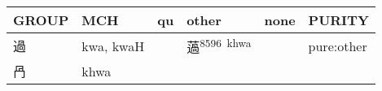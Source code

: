 \documentclass[14pt,a4paper]{scrartcl}
\begin{document}
\begin{longtable}[c]{@{}llllll@{}}
\toprule
\begin{minipage}[b]{0.14\columnwidth}\raggedright\strut
GROUP
\strut\end{minipage} &
\begin{minipage}[b]{0.14\columnwidth}\raggedright\strut
MCH
\strut\end{minipage} &
\begin{minipage}[b]{0.14\columnwidth}\raggedright\strut
qu
\strut\end{minipage} &
\begin{minipage}[b]{0.14\columnwidth}\raggedright\strut
other
\strut\end{minipage} &
\begin{minipage}[b]{0.14\columnwidth}\raggedright\strut
none
\strut\end{minipage} &
\begin{minipage}[b]{0.14\columnwidth}\raggedright\strut
PURITY
\strut\end{minipage}\tabularnewline
\midrule
\endhead
\begin{minipage}[t]{0.14\columnwidth}\raggedright\strut
過
\strut\end{minipage} &
\begin{minipage}[t]{0.14\columnwidth}\raggedright\strut
kwa, kwaH
\strut\end{minipage} &
\begin{minipage}[t]{0.14\columnwidth}\raggedright\strut
\strut\end{minipage} &
\begin{minipage}[t]{0.14\columnwidth}\raggedright\strut
薖\textsuperscript{8596~khwa}
\strut\end{minipage} &
\begin{minipage}[t]{0.14\columnwidth}\raggedright\strut
\strut\end{minipage} &
\begin{minipage}[t]{0.14\columnwidth}\raggedright\strut
pure:other
\strut\end{minipage}\tabularnewline
\begin{minipage}[t]{0.14\columnwidth}\raggedright\strut
冎
\strut\end{minipage} &
\begin{minipage}[t]{0.14\columnwidth}\raggedright\strut
khwa
\strut\end{minipage} &
\begin{minipage}[t]{0.14\columnwidth}\raggedright\strut
\strut\end{minipage} &

\end{longtable}
\end{document}
